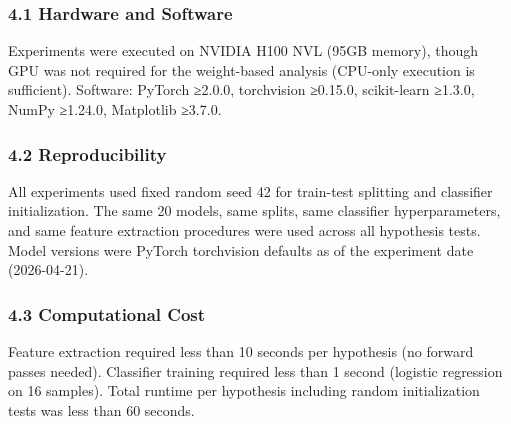 
\subsubsection{4.1 Hardware and Software}

Experiments were executed on NVIDIA H100 NVL (95GB memory), though GPU was not required for the weight-based analysis (CPU-only execution is sufficient). Software: PyTorch ≥2.0.0, torchvision ≥0.15.0, scikit-learn ≥1.3.0, NumPy ≥1.24.0, Matplotlib ≥3.7.0.

\subsubsection{4.2 Reproducibility}

All experiments used fixed random seed 42 for train-test splitting and classifier initialization. The same 20 models, same splits, same classifier hyperparameters, and same feature extraction procedures were used across all hypothesis tests. Model versions were PyTorch torchvision defaults as of the experiment date (2026-04-21).

\subsubsection{4.3 Computational Cost}

Feature extraction required less than 10 seconds per hypothesis (no forward passes needed). Classifier training required less than 1 second (logistic regression on 16 samples). Total runtime per hypothesis including random initialization tests was less than 60 seconds.
